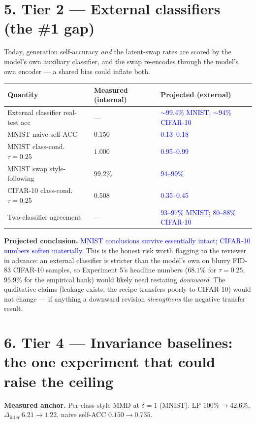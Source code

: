 \documentclass[10pt,letterpaper]{article}
\newcommand{\pj}[1]{\textcolor{blue}{#1}}
\begin{document}
\section*{5. Tier 2 --- External classifiers (the \#1 gap)}

Today, generation self-accuracy \emph{and} the latent-swap rates are scored
by the model's own auxiliary classifier, and the swap re-encodes through the
model's own encoder --- a shared bias could inflate both.

\begin{table}[h]
\centering
\small
\begin{tabular}{lll}
\toprule
Quantity & Measured (internal) & Projected (external) \\
\midrule
External classifier real-test acc & --- & \pj{$\sim$99.4\% MNIST; $\sim$94\% CIFAR-10} \\
MNIST naive self-ACC              & $0.150$ & \pj{0.13--0.18} \\
MNIST class-cond.\ $\tau{=}0.25$  & $1.000$ & \pj{0.95--0.99} \\
MNIST swap style-following        & $99.2\%$ & \pj{94--99\%} \\
CIFAR-10 class-cond.\ $\tau{=}0.25$ & $0.508$ & \pj{0.35--0.45} \\
Two-classifier agreement          & --- & \pj{93--97\% MNIST; 80--88\% CIFAR-10} \\
\bottomrule
\end{tabular}
\end{table}

\textbf{Projected conclusion.} \pj{MNIST conclusions survive essentially
intact; CIFAR-10 numbers soften materially.} This is the honest risk worth
flagging to the reviewer in advance: an external classifier is stricter than
the model's own on blurry FID-$83$ CIFAR-10 samples, so
Experiment 5's headline numbers ($68.1\%$ for $\tau{=}0.25$, $95.9\%$ for the
empirical bank) would likely need restating \emph{downward}. The qualitative
claims (leakage exists; the recipe transfers poorly to CIFAR-10) would not
change --- if anything a downward revision \emph{strengthens} the negative
transfer result.

\section*{6. Tier 4 --- Invariance baselines: the one experiment that could raise the ceiling}

\textbf{Measured anchor.} Per-class style MMD at $\delta{=}1$ (MNIST): LP
$100\%\to42.6\%$, $\Delta_{\mathrm{inter}}\ 6.21\to1.22$, naive self-ACC
$0.150\to0.735$.
\end{document}
